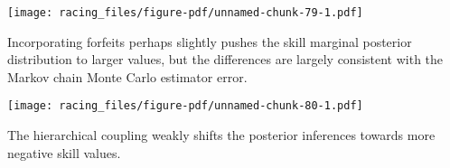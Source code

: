 \documentclass[
  letterpaper,
  DIV=11,
  numbers=noendperiod]{scrartcl}
\newenvironment{Shaded}{\begin{snugshade}}{\end{snugshade}}
\newcommand{\AttributeTok}[1]{\textcolor[rgb]{0.40,0.45,0.13}{#1}}
\newcommand{\ConstantTok}[1]{\textcolor[rgb]{0.56,0.35,0.01}{#1}}
\newcommand{\DecValTok}[1]{\textcolor[rgb]{0.68,0.00,0.00}{#1}}
\newcommand{\FloatTok}[1]{\textcolor[rgb]{0.68,0.00,0.00}{#1}}
\newcommand{\FunctionTok}[1]{\textcolor[rgb]{0.28,0.35,0.67}{#1}}
\newcommand{\NormalTok}[1]{\textcolor[rgb]{0.00,0.23,0.31}{#1}}
\newcommand{\SpecialCharTok}[1]{\textcolor[rgb]{0.37,0.37,0.37}{#1}}
\newcommand{\StringTok}[1]{\textcolor[rgb]{0.13,0.47,0.30}{#1}}
\begin{document}
\texttt{[image: racing\_files/figure-pdf/unnamed-chunk-79-1.pdf]}

Incorporating forfeits perhaps slightly pushes the skill marginal
posterior distribution to larger values, but the differences are largely
consistent with the Markov chain Monte Carlo estimator error.

\begin{Shaded}
\end{Shaded}

\texttt{[image: racing\_files/figure-pdf/unnamed-chunk-80-1.pdf]}

The hierarchical coupling weakly shifts the posterior inferences towards
more negative skill values.
\end{document}
